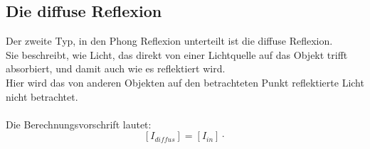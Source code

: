 \documentclass[a4paper]{scrartcl}%
\begin{document}
    \subsection{Die diffuse Reflexion}%
    \label{sub:die_diffuse_reflexion}
        Der zweite Typ, in den Phong Reflexion unterteilt ist die diffuse Reflexion.\\
        Sie beschreibt, wie Licht, das direkt von einer Lichtquelle auf das Objekt trifft absorbiert, und damit auch wie es reflektiert wird.\\
        Hier wird das von anderen Objekten auf den betrachteten Punkt reflektierte Licht nicht betrachtet.\\
        \\Die Berechnungsvorschrift lautet:\\
        \begin{equation}
            \label{eq:diff}
                [I_{diffus}] = [I_{in}] \cdot 
        \end{equation}
    
    
\end{document}
